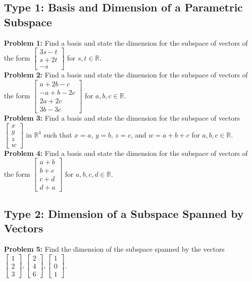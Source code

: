\documentclass{article}
\begin{document}
\subsection*{Type 1: Basis and Dimension of a Parametric Subspace}
\textbf{Problem 1:} Find a basis and state the dimension for the subspace of vectors of the form $\begin{bmatrix} 3s - t \\ s + 2t \\ -s \end{bmatrix}$ for $s,t \in \mathbb{R}$. \\

\textbf{Problem 2:} Find a basis and state the dimension for the subspace of vectors of the form $\begin{bmatrix} a + 2b - c \\ -a + b - 2c \\ 2a + 2c \\ 3b - 3c \end{bmatrix}$ for $a,b,c \in \mathbb{R}$. \\

\textbf{Problem 3:} Find a basis and state the dimension for the subspace of vectors $\begin{bmatrix} x \\ y \\ z \\ w \end{bmatrix}$ in $\mathbb{R}^4$ such that $x = a$, $y = b$, $z = c$, and $w = a+b+c$ for $a,b,c \in \mathbb{R}$. \\

\textbf{Problem 4:} Find a basis and state the dimension for the subspace of vectors of the form $\begin{bmatrix} a+b \\ b+c \\ c+d \\ d+a \end{bmatrix}$ for $a,b,c,d \in \mathbb{R}$. \\

\subsection*{Type 2: Dimension of a Subspace Spanned by Vectors}
\textbf{Problem 5:} Find the dimension of the subspace spanned by the vectors $\begin{bmatrix} 1 \\ 2 \\ 3 \end{bmatrix}, \begin{bmatrix} 2 \\ 4 \\ 6 \end{bmatrix}, \begin{bmatrix} 1 \\ 0 \\ 1 \end{bmatrix}$. \\
\end{document}
